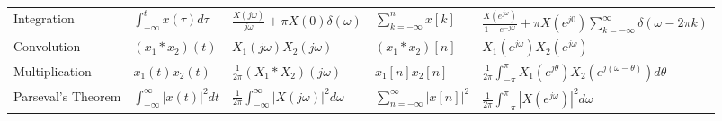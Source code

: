 \documentclass[8pt]{article}
\begin{document}
\begin{multicols}{2}
\begin{table*}[ht]
\begin{tabular}{@{}lllll@{}}
            Integration        & $\int_{-\infty}^t x(\tau) d\tau$    & $\frac{X(j\omega)}{j\omega} + \pi X(0)\delta(\omega)$         & $\sum_{k=-\infty}^n x[k]$          & $\frac{X(e^{j\omega})}{1-e^{-j\omega}} + \pi X(e^{j0})\sum_{k=-\infty}^{\infty}\delta(\omega - 2\pi k)$ \\ [1mm]
            Convolution        & $(x_1 * x_2)(t)$                    & $X_1(j\omega) X_2(j\omega)$                                   & $(x_1 * x_2)[n]$                   & $X_1(e^{j\omega}) X_2(e^{j\omega})$                                                                     \\ [1mm]
            Multiplication     & $x_1(t)x_2(t)$                      & $\frac{1}{2\pi}(X_1 * X_2)(j\omega)$                          & $x_1[n]x_2[n]$                     & $\frac{1}{2\pi}\int_{-\pi}^{\pi} X_1(e^{j\theta}) X_2(e^{j(\omega-\theta)}) d\theta$                    \\ [1mm]
            Parseval's Theorem & $\int_{-\infty}^\infty |x(t)|^2 dt$ & $\frac{1}{2\pi} \int_{-\infty}^\infty |X(j\omega)|^2 d\omega$ & $\sum_{n=-\infty}^\infty |x[n]|^2$ & $\frac{1}{2\pi} \int_{-\pi}^{\pi} |X(e^{j\omega})|^2 d\omega$                                           \\
            \bottomrule
        \end{tabular}
    \end{table*}


\end{multicols}
\end{document}
